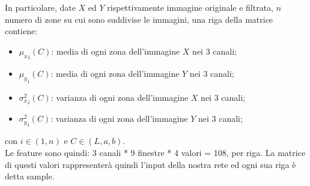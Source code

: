 \documentclass[a4paper,11pt]{article}
\begin{document}
    In particolare, date $X$ ed $Y$ rispettivamente immagine originale e filtrata, $n$ numero di zone su cui sono suddivise le immagini,
    una riga della matrice contiene: 
    \begin{itemize}
        \item ${\mu_x}_i(C)$: media di ogni zona dell'immagine $X$ nei 3 canali;
        \item ${\mu_y}_i(C)$:  media di ogni zona dell'immagine $Y$ nei 3 canali;
        \item ${\sigma^2_x}_i(C)$: varianza di ogni zona dell'immagine $X$ nei 3 canali;
        \item ${\sigma^2_y}_i(C)$: varianza di ogni zona dell'immagine $Y$ nei 3 canali;
    \end{itemize}
    con $i \in (1,n)$ e $C \in (L, a, b)$.
    \\Le feature sono quindi: 3 canali * 9 finestre * 4 valori = 108, per riga.
    La matrice di questi valori rappresenterà quindi l'input della nostra rete ed ogni sua riga è detta sample.
    \newpage
\end{document}
